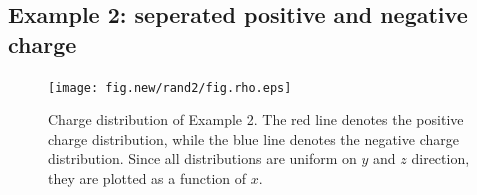 \documentclass[aps,pre,preprint]{revtex4}
\renewcommand{\v}[1]{\textbf{\textit{#1}}}
\begin{document}




\subsection{Example 2: seperated positive and negative charge}
\label{sec:example2}

\begin{figure}
  \centering
  \texttt{[image: fig.new/rand2/fig.rho.eps]}
  \caption{Charge distribution of Example 2. The red line
    denotes the positive charge distribution, while the blue line
    denotes the negative charge distribution. Since all distributions
    are uniform on $y$ and $z$ direction, they are plotted as a
    function of $x$.}
  \label{fig:tmp-rho2}
\end{figure}
\end{document}
